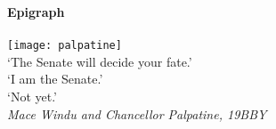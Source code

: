 
\clearpage

\narrowlinespacing

\vspace*{4mm}

\begin{center}
    \textbf{Epigraph}\\~\\
    \texttt{[image: palpatine]}\\
    `The Senate will decide your fate.'\\
    `I am the Senate.'\\
    `Not yet.'\\
    \emph{Mace Windu and Chancellor Palpatine, 19BBY}
\end{center}
\normallinespacing
